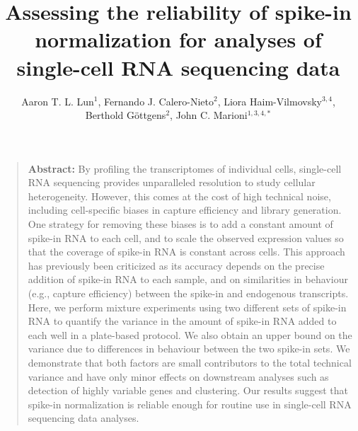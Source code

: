 \documentclass{article}
\title{Assessing the reliability of spike-in normalization for analyses of single-cell RNA sequencing data}
\author{Aaron T. L. Lun$^1$, Fernando J. Calero-Nieto$^2$, Liora Haim-Vilmovsky$^{3,4}$, \\ Berthold G\"ottgens$^2$, John C. Marioni$^{1,3,4,*}$}
\date{
    \begin{minipage}{0.9\textwidth}
        \begin{flushleft} 
            \begin{small}
                $^1$Cancer Research UK Cambridge Institute, University of Cambridge, Li Ka Shing Centre, Robinson Way, Cambridge CB2 0RE, United Kingdom \\
                $^2$Wellcome Trust and MRC Cambridge Stem Cell Institute, University of Cambridge, Wellcome Trust/MRC Building, Hills Road, Cambridge CB2 0XY, United Kingdom \\
                $^3$EMBL European Bioinformatics Institute, Wellcome Genome Campus, Hinxton, Cambridge CB10 1SD, United Kingdom \\
                $^4$Wellcome Trust Sanger Institute, Wellcome Genome Campus, Hinxton, Cambridge CB10 1SA, United Kingdom \\
                $^*$Corresponding author (email: marioni@ebi.ac.uk)
            \end{small}
        \end{flushleft}
    \end{minipage}\\[0.2in]
    \today{}
}
\begin{document}
\maketitle

\begin{quote}
\textbf{Abstract:}
By profiling the transcriptomes of individual cells, single-cell RNA sequencing provides unparalleled resolution to study cellular heterogeneity.
However, this comes at the cost of high technical noise, including cell-specific biases in capture efficiency and library generation.
One strategy for removing these biases is to add a constant amount of spike-in RNA to each cell, and to scale the observed expression values so that the coverage of spike-in RNA is constant across cells.
This approach has previously been criticized as its accuracy depends on the precise addition of spike-in RNA to each sample, and on similarities in behaviour (e.g., capture efficiency) between the spike-in and endogenous transcripts.
Here, we perform mixture experiments using two different sets of spike-in RNA to quantify the variance in the amount of spike-in RNA added to each well in a plate-based protocol.
We also obtain an upper bound on the variance due to differences in behaviour between the two spike-in sets.
We demonstrate that both factors are small contributors to the total technical variance and have only minor effects on downstream analyses such as detection of highly variable genes and clustering.
Our results suggest that spike-in normalization is reliable enough for routine use in single-cell RNA sequencing data analyses.
\end{quote}
\end{document}

